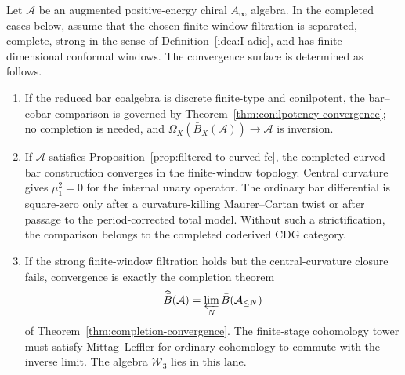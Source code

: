 \begin{theorem}\label{thm:bar-convergence-fc}
Let $\mathcal{A}$ be an augmented positive-energy chiral $A_\infty$
algebra.  In the completed cases below, assume that the chosen
finite-window filtration is separated, complete, strong in the sense
of Definition~\ref{idea:I-adic}, and has finite-dimensional conformal
windows.  The convergence surface is determined as follows.
\begin{enumerate}
\item If the reduced bar coalgebra is discrete finite-type and
conilpotent, the bar--cobar comparison is governed by
Theorem~\ref{thm:conilpotency-convergence}; no completion is needed,
and $\Omega_X(\bar B_X(\mathcal A))\to\mathcal A$ is inversion.
\item If $\mathcal{A}$ satisfies
Proposition~\ref{prop:filtered-to-curved-fc}, the completed curved bar
construction converges in the finite-window topology.  Central
curvature gives $\mu_1^2=0$ for the internal unary operator.  The
ordinary bar differential is square-zero only after a
curvature-killing Maurer--Cartan twist or after passage to the
period-corrected total model.  Without such a strictification, the
comparison belongs to the completed coderived CDG category.
\item If the strong finite-window filtration holds but the
central-curvature closure fails, convergence is exactly the
completion theorem
\[
\widehat{\bar B}(\mathcal A)=\varprojlim_N\bar B(\mathcal A_{\le N})
\]
of Theorem~\ref{thm:completion-convergence}.  The finite-stage
cohomology tower must satisfy Mittag--Leffler for ordinary cohomology
to commute with the inverse limit.  The algebra $\mathcal W_3$ lies in
this lane.
\end{enumerate}
\end{theorem}

